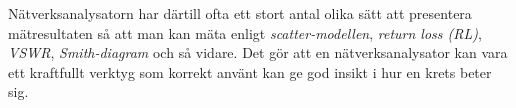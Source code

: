 \newpage %
Nätverksanalysatorn har därtill ofta ett stort antal olika sätt att presentera
mätresultaten så att man kan mäta enligt \emph{scatter-modellen},
\emph{return loss (RL)}, \emph{VSWR}, \emph{Smith-diagram} och så vidare.
Det gör att en nätverksanalysator kan vara ett kraftfullt verktyg som korrekt
använt kan ge god insikt i hur en krets beter sig.
